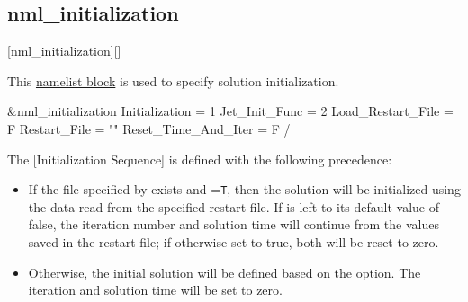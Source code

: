 \subsection{nml\_initialization}
\label{SEC:nml_initialization}
\inp*[nmlInitialization]{}[nml\_initialization][]

This \hyperref[SEC:User_Input]{namelist block}
is used to specify solution initialization.

\begin{nmlblocklst}[
,label={LST:nml_initialization}
,caption={Namelist nml\_initialization.}
]
&nml_initialization
  Initialization                = 1
  Jet_Init_Func                 = 2
  Load_Restart_File             = F
  Restart_File                  = ""
  Reset_Time_And_Iter           = F
/
\end{nmlblocklst}

The [Initialization Sequence]
is defined with the following precedence:
\begin{itemize}
%
%
\item
If the file specified by 
exists and
=\texttt{T},
then the solution will be initialized using the data read from
the specified restart file.
%
If  is left
to its default value of false, the iteration number and solution time will
continue from the values saved in the restart file; if otherwise set to true,
both will be reset to zero.
%
\item
Otherwise, the initial solution will be defined based on
the  option.
The iteration and solution time will be set to zero.
\end{itemize}

